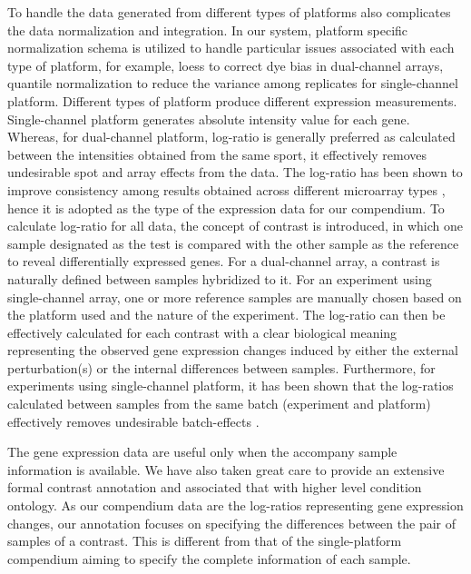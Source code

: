 To handle the data generated from different types of platforms also complicates the data normalization and integration. In our system, platform specific normalization schema is utilized to handle particular issues associated with each type of platform, for example, loess to correct dye bias in dual-channel arrays, quantile normalization to reduce the variance among replicates for single-channel platform. Different types of platform produce different expression measurements. Single-channel platform generates absolute intensity value for each gene. Whereas, for dual-channel platform, log-ratio is generally preferred as calculated between the intensities obtained from the same sport, it effectively removes undesirable spot and array effects from the data. The log-ratio has been shown to improve consistency among results obtained across different microarray types \cite{Shi2006}, hence it is adopted as the type of the expression data for our compendium. To calculate log-ratio for all data, the concept of contrast is introduced, in which one sample designated as the test is compared with the other sample as the reference to reveal differentially expressed genes. For a dual-channel array, a contrast is naturally defined between samples hybridized to it. For an experiment using single-channel array, one or more reference samples are manually chosen based on the platform used and the nature of the experiment. The log-ratio can then be effectively calculated for each contrast with a clear biological meaning representing the observed gene expression changes induced by either the external perturbation(s) or the internal differences between samples. Furthermore, for experiments using single-channel platform, it has been shown that the log-ratios calculated between samples from the same batch (experiment and platform) effectively removes undesirable batch-effects \cite{Luo2010}.
 
The gene expression data are useful only when the accompany sample information is available.  We have also taken great care to provide an extensive formal contrast annotation and associated that with higher level condition ontology. As our compendium data are the log-ratios representing gene expression changes, our annotation focuses on specifying the differences between the pair of samples of a contrast. This is different from that of the single-platform compendium aiming to specify the complete information of each sample. 

